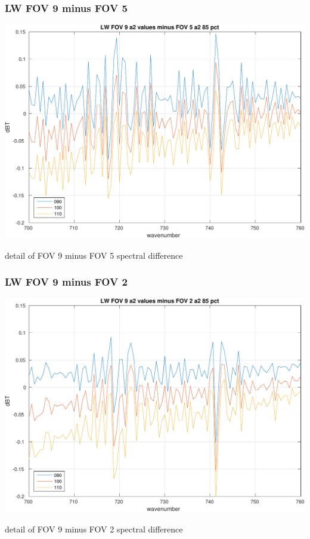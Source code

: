 \documentclass[11pt]{beamer}
\begin{document}
\begin{frame}
\frametitle{LW FOV 9 minus FOV 5}
\begin{center}
  \includegraphics[scale=0.5]{figures/LW_FOV_9_minus_5_a2_85.pdf}
\end{center}  
\begin{center}
  detail of FOV 9 minus FOV 5 spectral difference
\end{center}
\end{frame}
\begin{frame}
\frametitle{LW FOV 9 minus FOV 2}
\begin{center}
  \includegraphics[scale=0.5]{figures/LW_FOV_9_minus_2_a2_85.pdf}
\end{center}  
\begin{center}
  detail of FOV 9 minus FOV 2 spectral difference
\end{center}
\end{frame}
\end{document}
